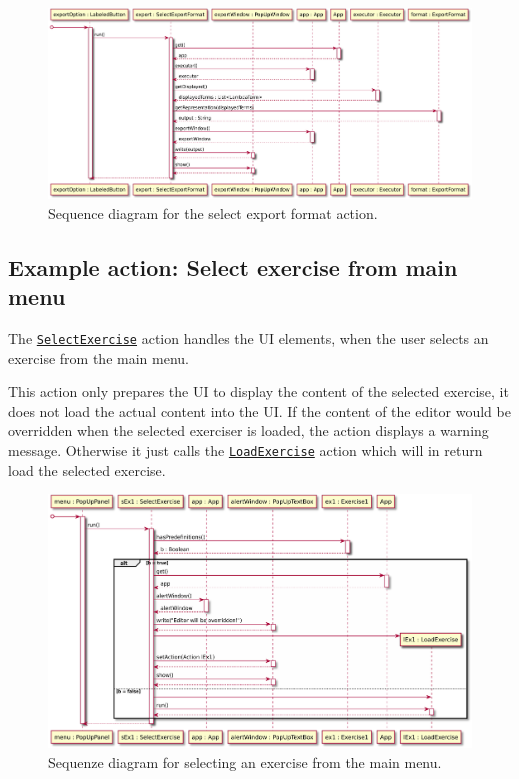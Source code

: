 \begin{figure}[H]
	\centering
	\includegraphics[width=\textwidth]{sequenceDiagrams/exportOutput}
	\caption{Sequence diagram for the select export format action.}
\end{figure}

\subsection{Example action: Select exercise from main menu}
The \texttt{\hyperref[type:edu.kit.wavelength.client.view.action.SelectExercise]{SelectExercise}} 
action handles the UI elements, when the user selects an exercise from the main menu.

This action only prepares the UI to display the content of the selected exercise, 
it does not load the actual content into the UI. If the content of the editor would 
be overridden when the selected exerciser is loaded, the action displays a warning
message. Otherwise it just calls the \texttt{\hyperref[type:edu.kit.wavelength.client.view.action.LoadExercise]{LoadExercise}} 
action which will in return load the selected exercise.

\begin{figure}[H]
	\centering
	\includegraphics[width=\textwidth]{sequenceDiagrams/selectExercise}
	\caption{Sequenze diagram for selecting an exercise from the main menu.}
\end{figure}

